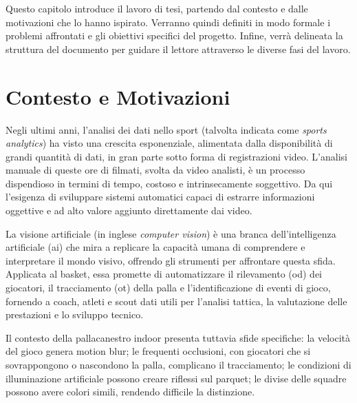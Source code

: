 \documentclass[12pt,a4paper,openright,twoside]{book}
\begin{document}
Questo capitolo introduce il lavoro di tesi, partendo dal contesto
e dalle motivazioni che lo hanno ispirato. Verranno quindi definiti
in modo formale i problemi affrontati e gli obiettivi specifici
del progetto. Infine, verrà delineata la struttura del documento
per guidare il lettore attraverso le diverse fasi del lavoro.


\section{Contesto e Motivazioni}
\label{sec:contesto-motivazioni}
Negli ultimi anni, l'analisi dei dati nello sport (talvolta indicata
come \emph{sports analytics}) ha visto una crescita esponenziale,
alimentata dalla disponibilità di grandi quantità di dati, 
in gran parte sotto forma di registrazioni video. L'analisi
manuale di queste ore di filmati, svolta da video analisti, è un
processo dispendioso in termini di tempo, costoso e
intrinsecamente soggettivo. Da qui l'esigenza di sviluppare
sistemi automatici capaci di estrarre informazioni oggettive e ad
alto valore aggiunto direttamente dai video.

La visione artificiale (in inglese \emph{computer vision}) è una branca
dell'intelligenza artificiale (\ac{ai}) che mira a replicare la capacità
umana di comprendere e interpretare il mondo visivo, offrendo gli
strumenti per affrontare questa sfida. Applicata al basket, essa
promette di automatizzare il rilevamento (\ac{od}) dei giocatori,
il tracciamento (\ac{ot}) della palla e l'identificazione di eventi di gioco,
fornendo a coach, atleti e scout dati utili per l'analisi
tattica, la valutazione delle prestazioni e lo sviluppo tecnico.

Il contesto della pallacanestro indoor presenta tuttavia sfide
specifiche: la velocità del gioco genera motion blur; le frequenti
occlusioni, con giocatori che si sovrappongono o nascondono la palla,
complicano il tracciamento; le condizioni di illuminazione artificiale
possono creare riflessi sul parquet; le divise delle squadre possono
avere colori simili, rendendo difficile la distinzione.
\end{document}
